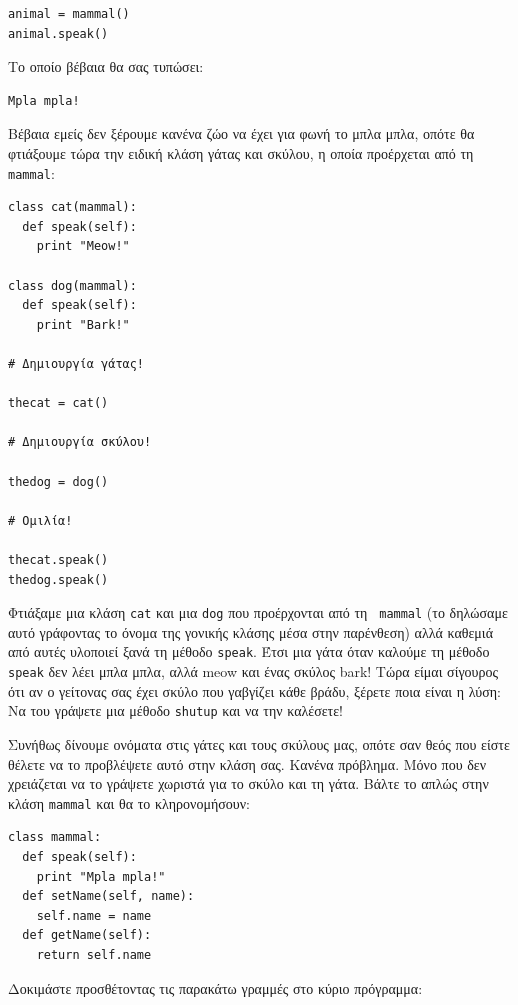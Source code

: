 \begin{verbatim}
animal = mammal()
animal.speak()
\end{verbatim}

Το οποίο βέβαια θα σας τυπώσει:

\begin{verbatim}
Mpla mpla!
\end{verbatim}

Βέβαια εμείς δεν ξέρουμε κανένα ζώο να έχει για φωνή το μπλα μπλα, οπότε
θα φτιάξουμε τώρα την ειδική κλάση γάτας και σκύλου, η οποία προέρχεται
από τη {\tt mammal}:

\begin{verbatim}
class cat(mammal):
  def speak(self):
    print "Meow!"

class dog(mammal):
  def speak(self):
    print "Bark!"

# Δημιουργία γάτας!

thecat = cat()

# Δημιουργία σκύλου!

thedog = dog()

# Ομιλία!

thecat.speak()
thedog.speak()
\end{verbatim}

Φτιάξαμε μια κλάση {\tt cat} και μια {\tt dog} που προέρχονται από τη {\tt
mammal} (το δηλώσαμε αυτό γράφοντας το όνομα της γονικής κλάσης μέσα στην παρένθεση) αλλά καθεμιά από αυτές υλοποιεί ξανά τη μέθοδο {\tt speak}. Έτσι μια γάτα όταν καλούμε τη μέθοδο {\tt speak} δεν λέει μπλα μπλα, αλλά meow και ένας σκύλος bark! Τώρα είμαι σίγουρος ότι αν ο γείτονας σας έχει σκύλο που γαβγίζει κάθε βράδυ, ξέρετε ποια είναι η λύση: Να του γράψετε μια μέθοδο {\tt shutup} και να την καλέσετε!

Συνήθως δίνουμε ονόματα στις γάτες και τους σκύλους μας, οπότε σαν θεός που
είστε θέλετε να το προβλέψετε αυτό στην κλάση σας. Κανένα πρόβλημα. Μόνο
που δεν χρειάζεται να το γράψετε χωριστά για το σκύλο και τη γάτα. Βάλτε το
απλώς στην κλάση {\tt mammal} και θα το κληρονομήσουν:

\begin{verbatim}
class mammal:
  def speak(self):
    print "Mpla mpla!"
  def setName(self, name):
    self.name = name
  def getName(self):
    return self.name
\end{verbatim}

Δοκιμάστε προσθέτοντας τις παρακάτω γραμμές στο κύριο πρόγραμμα:

